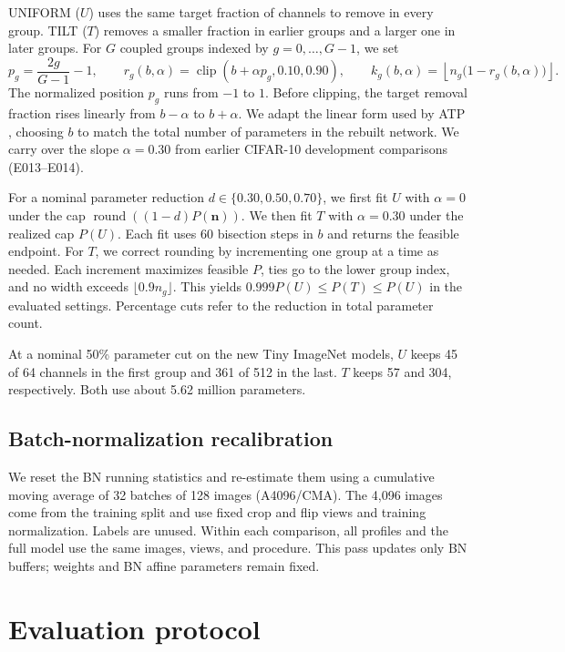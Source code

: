 \documentclass[11pt,a4paper]{article}
\newcommand{\Uniform}{UNIFORM}
\newcommand{\Tilt}{TILT}
\begin{document}
\Uniform{} ($U$) uses the same target fraction of channels to remove in
every group. \Tilt{} ($T$) removes a smaller fraction in earlier groups
and a larger one in later groups. For $G$ coupled groups indexed by
$g=0,\ldots,G-1$, we set
\begin{equation}
 p_g = \frac{2g}{G-1}-1,\qquad
 r_g(b,\alpha) = \operatorname{clip}(b+\alpha p_g, 0.10, 0.90),\qquad
 k_g(b,\alpha) = \left\lfloor n_g\bigl(1-r_g(b,\alpha)\bigr)\right\rfloor .
 \label{eq:tilt}
\end{equation}
The normalized position $p_g$ runs from $-1$ to $1$. Before clipping,
the target removal fraction rises linearly from $b-\alpha$ to
$b+\alpha$. We adapt the linear form used by ATP
\citep[Eq.~10]{huang2025atp}, choosing $b$ to match the total number of
parameters in the rebuilt network. We carry over the slope
$\alpha=0.30$ from earlier CIFAR-10 development comparisons (E013--E014).

For a nominal parameter reduction $d\in\{0.30,0.50,0.70\}$, we first
fit $U$ with $\alpha=0$ under the cap
$\operatorname{round}((1-d)P(\mathbf n))$. We then fit $T$ with
$\alpha=0.30$ under the realized cap $P(U)$. Each fit uses 60 bisection
steps in $b$ and returns the feasible endpoint. For $T$, we correct
rounding by incrementing one group at a time as needed. Each increment
maximizes feasible $P$, ties go to the lower group index, and no width
exceeds $\lfloor0.9n_g\rfloor$. This yields
$0.999P(U)\leq P(T)\leq P(U)$ in the evaluated settings. Percentage
cuts refer to the reduction in total parameter count.

At a nominal 50\% parameter cut on the new Tiny ImageNet models, $U$
keeps 45 of 64 channels in the first group and 361 of 512 in the last.
$T$ keeps 57 and 304, respectively. Both use about 5.62 million parameters.

\subsection{Batch-normalization recalibration}
We reset the BN running statistics \citep{ioffe2015bn} and re-estimate
them using a cumulative moving average of 32 batches of 128 images
(A4096/CMA). The 4,096 images come from the training split and use fixed
crop and flip views and training normalization. Labels are unused. Within
each comparison, all profiles and the full model use the same images,
views, and procedure. This pass updates only BN buffers; weights and
BN affine parameters remain fixed.

\section{Evaluation protocol}
\label{sec:evaluation}
\end{document}
